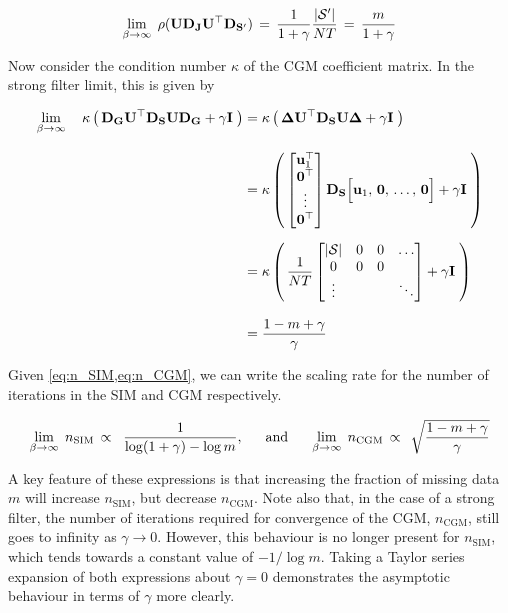 \begin{equation}
    \label{eq:beta_lim_inf}
    \lim_{\beta \rightarrow \infty} \; \rho(\mathbf{U} \mathbf{D}_{\mathbf{J}} \mathbf{U}^\top \mathbf{D}_{\mathbf{S}'}) \, = \, \frac{1}{1 + \gamma} \frac{|\mathcal{S}'|}{NT} \, = \, \frac{m}{1 + \gamma}
\end{equation}

Now consider the condition number $\kappa$ of the CGM coefficient matrix. In the strong filter limit, this is given by  

\begin{align}
    \lim_{\beta \rightarrow \infty} \quad \kappa \left(  \, \mathbf{D}_{\mathbf{G}} \mathbf{U}^\top \mathbf{D}_{\mathbf{S}} \mathbf{U} \mathbf{D}_{\mathbf{G}} + \gamma \mathbf{I} \; \right)  &= \kappa  \left(  \, \mathbf{\Delta} \mathbf{U}^\top \mathbf{D}_{\mathbf{S}} \mathbf{U} \mathbf{\Delta}  + \gamma \mathbf{I} \; \right) \notag \\[0.3cm]
    &= \kappa  \left(  \, 
    \begin{bmatrix} 
        \mathbf{u}_1^\top \\ 
        \mathbf{0}^\top \\
        \vdots \\ 
        \mathbf{0}^\top 
    \end{bmatrix} \mathbf{D}_{\mathbf{S}}  \Big[ \mathbf{u}_1, \, \mathbf{0}, \, \dots, \,\mathbf{0} \Big]
    + \gamma \mathbf{I} \; \right) \notag \\[0.2cm]
    &= \kappa  \left(  \, \frac{1}{NT}  \begin{bmatrix}
        |\mathcal{S}| & 0 & 0 & \dots \\
        0 & 0 & 0 &  \\
        \vdots & & & \ddots
    \end{bmatrix}   + \gamma \mathbf{I} \; \right) \notag \\[0.3cm]
    &= \frac{1 - m + \gamma}{\gamma}
\end{align}

Given \cref{eq:n_SIM,eq:n_CGM}, we can write the scaling rate for the number of iterations in the SIM and CGM respectively. 

\begin{equation}
    \label{eq:n_SFL}
    \lim_{\beta \rightarrow \infty} \;  n_\text{SIM} \, \propto \;\;  \frac{1}{\log(1 + \gamma) - \log m}, \;\; \quad \text{and} \quad \;\;  \lim_{\beta \rightarrow \infty} \;  n_\text{CGM} \, \propto \;\, \sqrt{\frac{1 - m + \gamma}{\gamma}}
\end{equation}


A key feature of these expressions is that increasing the fraction of missing data $m$ will increase $n_\text{SIM}$, but decrease $n_\text{CGM}$. Note also that, in the case of a strong filter, the number of iterations required for convergence of the CGM, $n_\text{CGM}$, still goes to infinity as $\gamma \rightarrow 0$. However, this behaviour is no longer present for $n_\text{SIM}$, which tends towards a constant value of $-1/\log m$. Taking a Taylor series expansion of both expressions about $\gamma=0$ demonstrates the asymptotic behaviour in terms of $\gamma$ more clearly. 


